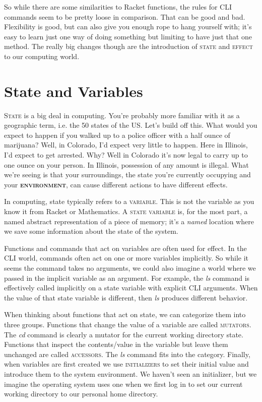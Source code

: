 \documentclass[]{tufte-handout}
\begin{document}
So while there are some similarities to Racket functions, the rules for CLI commands seem to be pretty loose in comparison.  That can be good and bad. Flexibility is good, but can also give you enough rope to hang yourself with; it's easy to learn just one way of doing something but limiting to have just that one method.  The really big changes though are the introduction of \textsc{state} and \textsc{effect} to our computing world.


\section{State and Variables}

\textsc{State} is a big deal in computing. You're probably more familiar with it as a geographic term, i.e. the 50 states of the US. Let's build off this. What would you expect to happen if you walked up to a police officer with a half ounce of marijuana? Well, in Colorado, I'd expect very little to happen. Here in Illinois, I'd expect to get arrested. Why? Well in Colorado it's now legal to carry up to one ounce on your person. In Illinois, possession of any amount is illegal. What we're seeing is that your surroundings, the state you're currently occupying and your \textbf{\textsc{environment}}, can cause different actions to have different effects.  

In computing, state typically refers to a \textsc{variable}.  This is not the variable as you know it from Racket or Mathematics. A \textsc{state variable} is, for the most part, a named abstract representation of a piece of memory; it's a \textit{named} location where we save some information about the state of the system. 

Functions and commands that act on variables are often used for effect. In the CLI world, commands often act on one or more variables implicitly. So while it seems the command takes no arguments, we could also imagine a world where we passed in the implicit variable as an argument. For example, the \textit{ls} command is effectively called implicitly on a state variable with explicit CLI arguments. When the value of that state variable is different, then \textit{ls} produces different behavior.

When thinking about functions that act on state, we can categorize them into three groups. Functions that change the value of a variable are called \textsc{mutators}.  The \textit{cd} command is clearly a mutator for the current working directory state. Functions that inspect the contents/value in the variable but leave them unchanged are called \textsc{accessors}. The \textit{ls} command fits into the category.  Finally, when variables are first created we use \textsc{initializers} to set their initial value and introduce them to the system environment. We haven't seen an initializer, but we imagine the operating system uses one when we first log in to set our current working directory to our personal home directory.  
\end{document}
